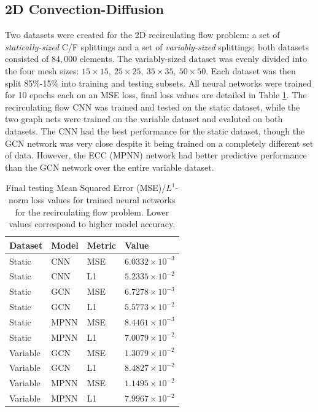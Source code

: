 \documentclass[review]{siamart190516}
\begin{document}
\subsection{2D Convection-Diffusion}

Two datasets were created for the 2D recirculating flow problem: a set of \textit{statically-sized} C/F splittings and a set of \textit{variably-sized} splittings; both datasets consisted of $84,000$ elements.  The variably-sized dataset was evenly divided into the four mesh sizes: $15\times 15,\: 25\times 25,\: 35\times 35,\: 50\times 50$.  Each dataset was then split 85\%-15\% into training and testing subsets.  All neural networks were trained for 10 epochs each on an MSE loss, final loss values are detailed in Table \ref{tab:conv_loss}.  The recirculating flow CNN was trained and tested on the static dataset, while the two graph nets were trained on the variable dataset and evaluted on both datasets.  The CNN had the best performance for the static dataset, though the GCN network was very close despite it being trained on a completely different set of data.  However, the ECC (MPNN) network had better predictive performance than the GCN network over the entire variable dataset.

\begin{table}[t]
\centering
\begin{tabular}{|l|l|l|l|}
\hline
Dataset & Model & Metric & Value \\
\hline
Static & CNN & MSE & $6.0332 \times 10^{-3}$ \\
Static & CNN & L1 & $5.2335 \times 10^{-2}$ \\
\hline
Static & GCN & MSE & $6.7278 \times 10^{-3}$ \\
Static & GCN & L1 & $5.5773 \times 10^{-2}$ \\
\hline
Static & MPNN & MSE & $8.4461 \times 10^{-3}$ \\
Static & MPNN & L1 & $7.0079 \times 10^{-2}$ \\
\hline
Variable & GCN & MSE & $1.3079 \times 10^{-2}$ \\
Variable & GCN & L1 & $8.4827 \times 10^{-2}$ \\
\hline
Variable & MPNN & MSE & $1.1495 \times 10^{-2}$ \\
Variable & MPNN & L1 & $7.9967 \times 10^{-2}$ \\
\hline
\end{tabular}
\caption{Final testing Mean Squared Error (MSE)/$L^1$-norm loss values for trained neural networks for the recirculating flow problem.  Lower values correspond to higher model accuracy.}
\label{tab:conv_loss}
\end{table}
\end{document}
